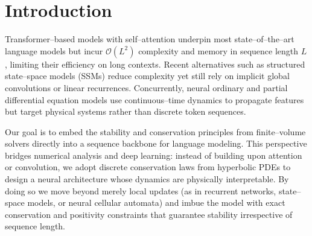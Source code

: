 \documentclass[10pt]{article}
\theoremstyle{definition}
\theoremstyle{remark}
\begin{document}
\begin{abstract}
  sequence accuracy under the same training budget.  DTFNs perfectly
  extrapolate from training lengths
  $4$--$20$ to test lengths up to $100$ bracket pairs (a $5\times$
  length gap) with no accuracy degradation, while baselines lose
  $10$--$13$ percentage points over the same range.  At sequence length
  $4096$, DTFN--U is $3.3\times$ faster than a two--layer Transformer
  and $1.6\times$ faster than an LSTM.  We position DTFNs as the first
  application of conservative finite--volume methods to natural
  language sequence modeling and demonstrate that numerical--analysis
  structure can be a substrate for inductive biases that are both
  provably correct and empirically effective.
\end{abstract}

\section{Introduction}

Transformer--based models with self--attention
\cite{vaswani2017attention} underpin most state--of--the--art language
models but incur $\mathcal{O}(L^2)$ complexity and memory in sequence
length $L$, limiting their efficiency on long contexts.  Recent
alternatives such as structured state--space models (SSMs)
\cite{gu2022combining,gu2022efficiently} reduce complexity yet still rely
on implicit global convolutions or linear recurrences.  Concurrently,
neural ordinary and partial differential equation models
\cite{raissi2019physics,mordvintsev2020growing} use continuous--time
dynamics to propagate features but target physical systems rather than
discrete token sequences.

Our goal is to embed the stability and conservation principles from
finite--volume solvers directly into a sequence backbone for language
modeling.  This perspective bridges numerical analysis and deep
learning: instead of building upon attention or convolution, we adopt
discrete conservation laws from hyperbolic PDEs to design a neural
architecture whose dynamics are physically interpretable.  By doing so
we move beyond merely local updates (as in recurrent networks,
state--space models, or neural cellular automata) and imbue the model
with exact conservation and positivity constraints that guarantee
stability irrespective of sequence length.
\end{document}
